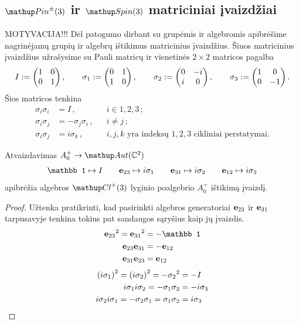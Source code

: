 \subsection{\texorpdfstring{$\pinpm$}{Pin+-(3)} ir \texorpdfstring{$\spin$}{Spin(3)} matriciniai įvaizdžiai}

{\color{red} MOTYVACIJA!!!}
Dėl patogumo dirbant su grupėmis ir algebromis apibrėšime
nagrinėjamų grupių ir algebrų ištikimus matricinius įvaizdžius.
Šiuos matricinius įvaizdžius užrašysime su Pauli matricų 
ir vienetinės $2\times2$ matricos pagalba
\begin{equation}
	I := \mqty(\imat{2})
	\,,\qquad
	\sigma_1 := \mqty(\pmat{1}) 
	\,,\qquad
	\sigma_2 := \mqty(\pmat{2}) 
	\,,\qquad
	\sigma_3 := \mqty(\pmat{3}) 
	\,.
\end{equation}
Šios matricos tenkina
\begin{equation}
	\begin{aligned}
		\sigma_i \sigma_i &= I \,,
		&&i\in{1,2,3}\,;
		\\
		\sigma_i \sigma_j &= - \sigma_j \sigma_i\,, 
		&&i\neq j \,;
		\\
		\sigma_i \sigma_j &= i \sigma_k \,,
		&&\text{$i,j,k$ yra indeksų $1,2,3$ cikliniai perstatymai}.
	\end{aligned}
\end{equation}


\begin{proposition}
	\label{prop:pauli_rep+}
	Atvaizdavimas $A_0^+ \to \mathup Aut (\set C^2)$
	\begin{equation}
		\mathbb 1	\mapsto	I		\qquad
		\vb e_{23} 	\mapsto	i\sigma_1	\qquad
		\vb e_{31}	\mapsto	i\sigma_2	\qquad
		\vb e_{12}	\mapsto	i\sigma_3	
	\end{equation}
	apibrėžia algebros $\Clp$ lyginio poalgebrio $A_0^+$ ištikimą įvaizdį.
\end{proposition}
\begin{proof}
	Užtenka pratikrinti, kad pasirinkti algebros generatoriai $\vb e_{23}$ ir $\vb e_{31}$
	tarpusavyje tenkina tokius pat sandaugos sąryšius kaip jų įvaizdis.
	\begin{align}
		{\vb e_{23}}^2 = {\vb e_{31}}^2 &= - \mathbb1
		\\
		\vb e_{23} \vb e_{31} &= - \vb e_{12}
		\\
		\vb e_{31} \vb e_{23} &= \vb e_{12}
	\end{align}
	\begin{align}
		\qty(i\sigma_1)^2 = \qty(i\sigma_2)^2 = - {\sigma_2}^2 &= - I
		\\
		i\sigma_1 i\sigma_2 = - \sigma_1 \sigma_2 &= - i\sigma_3
		\\
		i\sigma_2 i\sigma_1 = - \sigma_2 \sigma_1 = \sigma_1 \sigma_2 &= i\sigma_3
	\end{align}
\end{proof}


